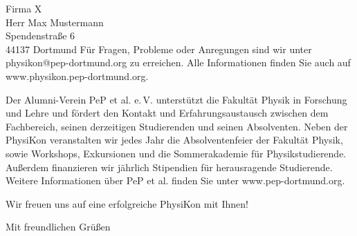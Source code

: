 \documentclass[
  pepbrief,
  fontsize=12pt,
  paper=a4,
  DIV=14,
  parskip=half,
  backaddress=false,
]{scrlttr2}
\begin{document}
\begin{letter}{%
  Firma X\\
  Herr Max Mustermann\\
  Spendenstraße 6\\
  44137 Dortmund%
}
Für Fragen, Probleme oder Anregungen sind wir unter physikon@pep-dortmund.org zu erreichen. Alle Informationen finden Sie auch auf www.physikon.pep-dortmund.org.

Der Alumni-Verein PeP et al. e.\,V. unterstützt die Fakultät Physik in Forschung und Lehre und fördert den Kontakt und Erfahrungsaustausch zwischen dem Fachbereich,
seinen derzeitigen Studierenden und seinen Absolventen. Neben der PhysiKon veranstalten wir jedes Jahr die Absolventenfeier der Fakultät Physik, sowie Workshops, Exkursionen
und die Sommerakademie für Physikstudierende. Außerdem finanzieren wir jährlich Stipendien für herausragende Studierende. Weitere Informationen über PeP et al. finden Sie unter
www.pep-dortmund.org.

Wir freuen uns auf eine erfolgreiche PhysiKon mit Ihnen!

\closing{Mit freundlichen Grüßen}

\end{letter}
\end{document}
